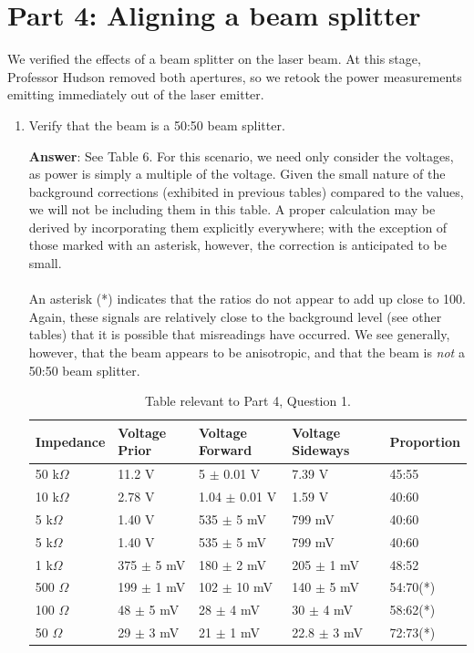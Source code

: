 \documentclass[10pt,a4paper]{article}
\begin{document}
\section*{Part 4: Aligning a beam splitter}
We verified the effects of a beam splitter on the laser beam. At this stage, Professor Hudson removed both apertures, so we retook the power measurements emitting immediately out of the laser emitter.
\begin{enumerate}
\item Verify that the beam is a 50:50 beam splitter.

\textbf{Answer}: See Table 6. For this scenario, we need only consider the voltages, as power is simply a multiple of the voltage. Given the small nature of the background corrections (exhibited in previous tables) compared to the values, we will not be including them in this table. A proper calculation may be derived by incorporating them explicitly everywhere; with the exception of those marked with an asterisk, however, the correction is anticipated to be small.\\
\\
An asterisk (*) indicates that the ratios do not appear to add up close to 100. Again, these signals are relatively close to the background level (see other tables) that it is possible that misreadings have occurred. We see generally, however, that the beam appears to be anisotropic, and that the beam is \textsl{not} a 50:50 beam splitter.
\begin{table}[h]
\centering
\begin{tabular}{|p{2cm}p{2cm}p{2cm}p{2cm}p{2cm}|}
\hline
Impedance & Voltage Prior & Voltage Forward & Voltage Sideways & Proportion\\
\hline
50 k$\Omega$ & 11.2 V & 5 $\pm$ 0.01 V & 7.39 V & 45:55\\
\hline
10 k$\Omega$ & 2.78 V & 1.04 $\pm$ 0.01 V & 1.59 V & 40:60\\
\hline
5 k$\Omega$ & 1.40 V & 535 $\pm$ 5 mV & 799 mV & 40:60\\
\hline
5 k$\Omega$ & 1.40 V & 535 $\pm$ 5 mV & 799 mV & 40:60\\
\hline
1 k$\Omega$ & 375 $\pm$ 5 mV & 180 $\pm$ 2 mV & 205 $\pm$ 1 mV & 48:52\\
\hline
500 $\Omega$ & 199 $\pm$ 1 mV & 102 $\pm$ 10 mV & 140 $\pm$ 5 mV & 54:70(*)\\
\hline
100 $\Omega$ & 48 $\pm$ 5 mV & 28 $\pm$ 4 mV & 30 $\pm$ 4 mV & 58:62(*)\\
\hline
50 $\Omega$ & 29 $\pm$ 3 mV & 21 $\pm$ 1 mV & 22.8 $\pm$ 3 mV & 72:73(*)\\
\hline
\end{tabular}
\caption{Table relevant to Part 4, Question 1.}
\end{table}
\end{enumerate}
\end{document}
